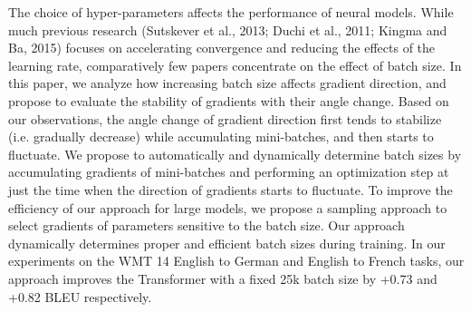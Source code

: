 The choice of hyper-parameters affects the performance of neural models. While much previous research (Sutskever et al., 2013; Duchi et al., 2011; Kingma and Ba, 2015) focuses on accelerating convergence and reducing the effects of the learning rate, comparatively few papers concentrate on the effect of batch size. In this paper, we analyze how increasing batch size affects gradient direction, and propose to evaluate the stability of gradients with their angle change. Based on our observations, the angle change of gradient direction first tends to stabilize (i.e. gradually decrease) while accumulating mini-batches, and then starts to fluctuate. We propose to automatically and dynamically determine batch sizes by accumulating gradients of mini-batches and performing an optimization step at just the time when the direction of gradients starts to fluctuate. To improve the efficiency of our approach for large models, we propose a sampling approach to select gradients of parameters sensitive to the batch size. Our approach dynamically determines proper and efficient batch sizes during training. In our experiments on the WMT 14 English to German and English to French tasks, our approach improves the Transformer with a fixed 25k batch size by +0.73 and +0.82 BLEU respectively.
